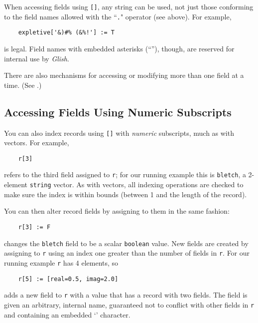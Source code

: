When accessing fields using {\tt []}, any string can be used, not just
those conforming to the field names allowed with the ``{\tt .}" operator
(see above).  For example,
\begin{verbatim}
    expletive['&)#% (&%!'] := T
\end{verbatim}
is legal.  Field names
with embedded asterisks (``{\tt *}''), though,
are reserved for internal use by {\em Glish}.

There are also mechanisms for accessing or modifying more than one field
at a time.   (See .)

\subsection{Accessing Fields Using Numeric Subscripts}
\label{records-as-vectors}

You can also index records using {\tt []} with {\em numeric} subscripts,
much as with vectors.  For example,
\begin{verbatim}
    r[3]
\end{verbatim}
refers to the third field assigned to {\tt r}; for our running example
this is {\tt bletch}, a 2-element {\tt string} vector.  As with vectors,
all indexing operations are checked to make sure the index is within
bounds (between 1 and the length of the record).

You can then alter record fields by assigning to them in the same fashion:
\begin{verbatim}
    r[3] := F
\end{verbatim}
changes the {\tt bletch} field to be a scalar {\tt boolean} value.  New
fields are created by assigning to {\tt r} using an index one greater
than the number of fields in {\tt r}.  For our running example {\tt r}
has 4 elements, so
\begin{verbatim}
    r[5] := [real=0.5, imag=2.0]
\end{verbatim}
adds a new field to {\tt r} with a value that has  a record with two fields.
The field is given an arbitrary, internal name, guaranteed not to conflict
with other fields in {\tt r} and containing an embedded `{\tt *}' character.

